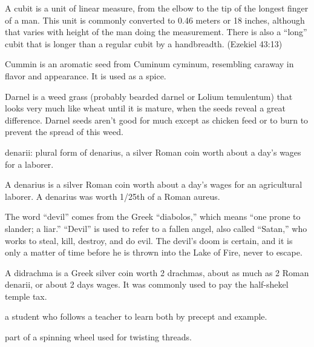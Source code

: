 {\par }{
\par }{\ILIB A cubit is a unit of linear measure, from the elbow to the tip of the longest finger of a man. This unit is commonly converted to 0.46 meters or 18 inches, although that varies with height of the man doing the measurement. There is also a “long” cubit that is longer than a regular cubit by a handbreadth. (Ezekiel 43:13)
\par }{
\par }{\ILIB Cummin is an aromatic seed from Cuminum cyminum, resembling caraway in flavor and appearance. It is used as a spice.
\par }{
\par }{\ILIB Darnel is a weed grass (probably bearded darnel or Lolium temulentum) that looks very much like wheat until it is mature, when the seeds reveal a great difference. Darnel seeds aren’t good for much except as chicken feed or to burn to prevent the spread of this weed.
\par }{
\par }{\ILIB denarii: plural form of denarius, a silver Roman coin worth about a day’s wages for a laborer.
\par }{
\par }{\ILIB A denarius is a silver Roman coin worth about a day’s wages for an agricultural laborer. A denarius was worth 1/25th of a Roman aureus.
\par }{
\par }{\ILIB The word “devil” comes from the Greek “diabolos,” which means “one prone to slander; a liar.” “Devil” is used to refer to a fallen angel, also called “Satan,” who works to steal, kill, destroy, and do evil. The devil’s doom is certain, and it is only a matter of time before he is thrown into the Lake of Fire, never to escape.
\par }{
\par }{\ILIB A didrachma is a Greek silver coin worth 2 drachmas, about as much as 2 Roman denarii, or about 2 days wages. It was commonly used to pay the half-shekel temple tax.
\par }{
\par }{\ILIB a student who follows a teacher to learn both by precept and example.
\par }{
\par }{\ILIB part of a spinning wheel used for twisting threads.
}

